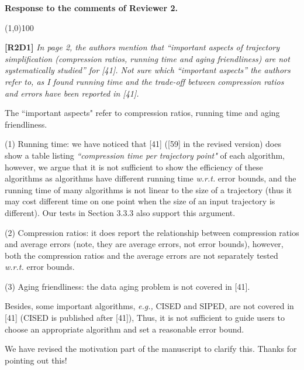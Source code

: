 \documentclass{letter}
\newcommand{\eg}{\emph{e.g.,}\xspace}
\newcommand{\wrt}{\emph{w.r.t.}\xspace}
\begin{document}
{\textbf{Response to the comments of Reviewer 2.}

\line(1,0){100}

\textbf{[R2D1]} \emph{In page 2, the authors mention that “important aspects of trajectory simplification (compression ratios, running time and aging friendliness) are not systematically studied” for [41]. Not sure which “important aspects” the authors refer to, as I found running time and the trade-off between compression ratios and errors have been reported in [41].}

The ``important aspects" refer to compression ratios, running time and aging friendliness.

(1) Running time: we have noticed that [41] ([59] in the revised version) does show a table listing \emph{``compression time per trajectory point"} of each algorithm, however, we argue that it is not sufficient to show the efficiency of these algorithms as algorithms have different running time \wrt error bounds, and the running time of many algorithms is not linear to the size of a trajectory (thus it may cost different time on one point when the size of an input trajectory is different). Our tests in Section 3.3.3 also support this argument.
 
(2) Compression ratios: it does report the relationship between compression ratios and average errors (note, they are average errors, not error bounds), however, both the compression ratios and the average errors are not separately tested \wrt error bounds.

(3) Aging friendliness: the data aging problem is not covered in [41]. 

Besides, some important algorithms, \eg CISED and SIPED, are not covered in [41] (CISED is published after [41]), Thus, it is not sufficient to guide users to choose an appropriate algorithm and set a reasonable error bound. 

We have revised the motivation part of the manuscript to clarify this.
Thanks for pointing out this!



}
\end{document}
